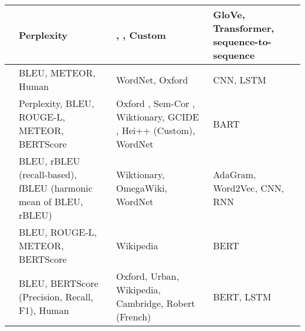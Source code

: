 \begin{longtable}{|p{3.5cm}|p{3.5cm}|p{3.5cm}|p{3.5cm}|}
    \hline
    \citeauthor*{mickus_mark_2019} \citeyear{mickus_mark_2019} \cite{mickus_mark_2019}                                        & Perplexity                                                       & \cite{noraset_definition_2016}, \cite{gadetsky_conditional_2018}, Custom                                                                      & GloVe, Transformer, sequence-to-sequence \\
    \hline
    \citeauthor*{li_explicit_2020} \citeyear{li_explicit_2020} \cite{li_explicit_2020}                                        & BLEU, METEOR, Human                                              & WordNet, Oxford                                                                                                                               & CNN, LSTM                                \\
    \hline
    \citeauthor*{bevilacqua_generationary_2020} \citeyear{bevilacqua_generationary_2020} \cite{bevilacqua_generationary_2020} & Perplexity, BLEU, ROUGE-L, METEOR, BERTScore                     & Oxford \cite{chang_what_2019}, Sem-Cor \cite{miller_semantic_1993}, Wiktionary, GCIDE \cite{noraset_definition_2016}, Hei++ (Custom), WordNet & BART                                     \\
    \hline
    \citeauthor*{sojka_evaluating_2020} \citeyear{sojka_evaluating_2020} \cite{sojka_evaluating_2020}                         & BLEU, rBLEU (recall-based), fBLEU (harmonic mean of BLEU, rBLEU) & Wiktionary, OmegaWiki, WordNet                                                                                                                & AdaGram, Word2Vec, CNN, RNN              \\
    \hline
    \citeauthor*{huang_cdm_2021} \citeyear{huang_cdm_2021} \cite{huang_cdm_2021}                                              & BLEU, ROUGE-L, METEOR, BERTScore                                 & Wikipedia                                                                                                                                     & BERT                                     \\
    \hline
    \citeauthor*{reid_vcdm_2020} \citeyear{reid_vcdm_2020} \cite{reid_vcdm_2020}                                              & BLEU, BERTScore (Precision, Recall, F1), Human                   & Oxford, Urban, Wikipedia, Cambridge, Robert (French)                                                                                          & BERT, LSTM                               \\
    \hline
\end{longtable}

